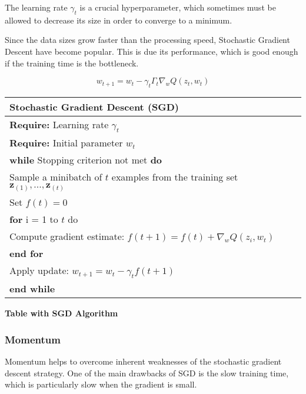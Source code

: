 The learning rate $\gamma_t$ is a crucial hyperparameter, which sometimes must be allowed to decrease its size in order to converge to a minimum. 

Since the data sizes grow faster than the processing speed, Stochastic Gradient Descent have become popular. This is due its performance, which is good enough if the training time is the bottleneck.

\begin{equation}
 w_{t+1}=w_t-\gamma_t\Gamma_t\nabla_wQ(z_t, w_t)
 \label{equ:2SGD}
\end{equation} 

\begin{center}
\begin{tabular}{| l |}
\hline
 \textbf{Stochastic Gradient Descent (SGD)}\\
\hline
 \textbf{Require:} Learning rate $\gamma_t$\\
 \textbf{Require:} Initial parameter $w_t$\\
 \hspace{1cm}\textbf{while} Stopping criterion not met \textbf{do}\\
 \hspace{2cm}Sample a minibatch of $t$ examples from the training set $\textbf{z}_{(1)} ,...,        \textbf{z}_{(t)}$ \\
 \hspace{2cm}Set \textbf{$f(t) = 0$}\\
 \hspace{2cm}\textbf{for} i = 1 to $t$ do\\
 \hspace{3cm}Compute gradient estimate: $f(t+1) = f(t) + \nabla_w Q(z_i,w_t)$\\
 \hspace{2cm}\textbf{end for}\\
 \hspace{2cm}Apply update: \textbf{$w_{t+1} = w_t - \gamma_t f(t+1)$}\\
 \hspace{1cm}\textbf{end while}\\
\hline
\end{tabular}
\end{center} 

\textbf{Table with SGD Algorithm}
\textcite{bottou2012stochastic} \textcite{Bengio-et-al-2015-Book} \textcite{Krizhevsky_imagenetclassification} 

\subsubsection{Momentum}
\label{subsub:moment}
Momentum helps to overcome inherent weaknesses of the stochastic gradient descent strategy. One of the main drawbacks of SGD is the slow training time, which is particularly slow when the gradient is small. 

